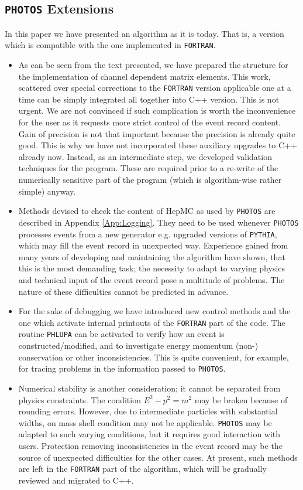 \documentclass[]{Photos_interface_design}
\begin{document}
\subsection{{\tt PHOTOS} Extensions}
In this paper we have presented an algorithm as it is today. 
That is, a version which is compatible with the one implemented in {\tt FORTRAN}.

\begin{itemize}
\item
As can be seen from the text presented, we have prepared the structure 
for the implementation of channel dependent matrix elements. This work, scattered
 over special corrections to the {\tt FORTRAN} version applicable one at a time can  
be simply integrated all together into C++ version. This is not urgent.
 We are  not convinced if such complication is worth 
the inconvenience for the user as it requests more strict control of the event 
record content. Gain of precision is 
not that important because the precision is already quite good. 
This is why we have not incorporated  these auxiliary upgrades to C++ already now.
Instead, as an intermediate step, we developed validation techniques
for the program. These are required prior to a re-write of the
numerically sensitive part of the program (which is algorithm-wise
rather simple) anyway.

\item
Methods devised to check the content of HepMC as used by {\tt PHOTOS} are
described in Appendix \ref{App:Logging}. 
They need to be used whenever {\tt PHOTOS} 
processes events from a new generator e.g. upgraded versions of  {\tt PYTHIA},
which may fill the event record in unexpected way.
Experience gained from many years of developing and maintaining the algorithm
have shown, that this is the most demanding task; the necessity to
adapt to varying physics and technical input of the event record pose
a multitude of problems. The nature of these difficulties cannot be
predicted in advance. 

\item
For the sake of debugging we have introduced new control methods 
and the one which activate
internal printouts of the {\tt FORTRAN} part of the code.
The routine {\tt PHLUPA} \cite{Barberio:1993qi} can be activated  to verify 
how an event is constructed/modified, and to investigate energy 
momentum (non-) conservation or other inconsistencies.
This is quite convenient, for example, for tracing problems in the
information passed to {\tt PHOTOS}.


\item
Numerical stability is another consideration; it cannot be separated from
physics constraints. The condition  $E^2-p^2=m^2$ may be broken  because of 
rounding errors.  However, due to intermediate particles with
  substantial widths, on mass shell condition may not be applicable.
{\tt PHOTOS} may be adapted to such varying conditions, but it requires
good interaction with users. Protection removing 
inconsistencies in the event record may be the source of unexpected difficulties
for the other cases. 
At present, such methods are left in the {\tt FORTRAN} part of the algorithm, 
which
will be gradually reviewed and  migrated to C++.
\end{itemize}
\end{document}
